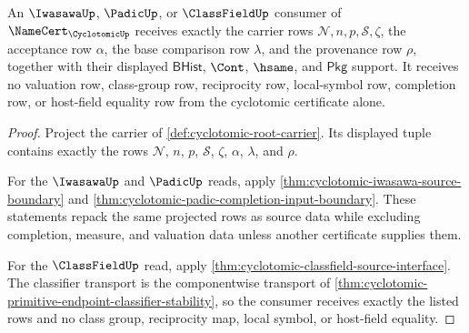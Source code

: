 \begin{theorem}
\label{thm:cyclotomic-downstream-source-exactness}
An $\IwasawaUp$, $\PadicUp$, or $\ClassFieldUp$ consumer of
$\NameCert_{\CyclotomicUp}$ receives exactly the carrier rows
$\mathcal{N},n,p,\mathcal{S},\zeta$, the acceptance row $\alpha$, the base
comparison row $\lambda$, and the provenance row $\rho$, together with their
displayed $\mathsf{BHist}$, $\Cont$, $\hsame$, and $\mathsf{Pkg}$ support. It
receives no valuation row, class-group row, reciprocity row, local-symbol row,
completion row, or host-field equality row from the cyclotomic certificate
alone.
\end{theorem}
\begin{proof}
Project the carrier of \autoref{def:cyclotomic-root-carrier}. Its displayed
tuple contains exactly the rows $\mathcal{N}$, $n$, $p$, $\mathcal{S}$,
$\zeta$, $\alpha$, $\lambda$, and $\rho$.

For the $\IwasawaUp$ and $\PadicUp$ reads, apply
\autoref{thm:cyclotomic-iwasawa-source-boundary} and
\autoref{thm:cyclotomic-padic-completion-input-boundary}. These statements
repack the same projected rows as source data while excluding completion,
measure, and valuation data unless another certificate supplies them.

For the $\ClassFieldUp$ read, apply
\autoref{thm:cyclotomic-classfield-source-interface}. The classifier
transport is the componentwise transport of
\autoref{thm:cyclotomic-primitive-endpoint-classifier-stability}, so the
consumer receives exactly the listed rows and no class group, reciprocity map,
local symbol, or host-field equality.
\end{proof}

